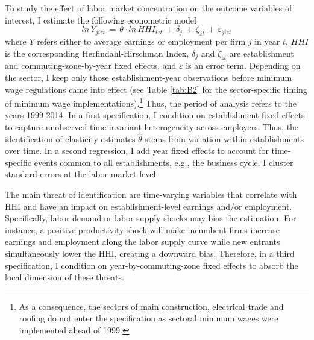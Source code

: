 \documentclass[11pt,oneside,reqno,xcolor=dvipsnames]{article} %
\begin{document}
To study the effect of labor market concentration on the outcome variables of interest, I estimate the following econometric model
\begin{equation}
\label{eq:2}
ln\,Y_{jizt} \,=\,  \theta \cdot ln\,H\!H\!I_{izt}  \,+\, \delta_{j}  \,+\, \zeta_{zt}  \,+\, \varepsilon_{jizt}
\end{equation}
where $Y$ refers either to average earnings or employment per firm $j$ in year $t$, $H\!H\!I$ is the corresponding Herfindahl-Hirschman Index, $\delta_{j}$ and $\zeta_{zt}$ are  establishment and commuting-zone-by-year fixed effects, and $\varepsilon$ is an error term. Depending on the sector, I keep only those establishment-year observations before minimum wage regulations came into effect (see Table \ref{tab:B2} for the sector-specific timing of minimum wage implementations).\footnote{As a consequence, the sectors of main construction, electrical trade and roofing do not enter the specification as sectoral minimum wages were implemented ahead of 1999.} Thus, the period of analysis refers to the years 1999-2014. In a first specification, I condition on establishment fixed effects to capture unobserved time-invariant heterogeneity across employers. Thus, the identification of elasticity estimates $\hat{\theta}$ stems from variation within establishments over time. In a second regression, I add year fixed effects to account for time-specific events common to all establishments, e.g., the business cycle. I cluster standard errors at the labor-market level.

The main threat of identification are time-varying variables that correlate with HHI and have an impact on establishment-level earnings and/or employment. Specifically, labor demand or labor supply shocks may bias the estimation. For instance, a positive productivity shock will make incumbent firms increase earnings and employment along the labor supply curve while new entrants simultaneously lower the HHI, creating a downward bias. Therefore, in a third specification, I condition on year-by-commuting-zone fixed effects to absorb the local dimension of these threats.
\end{document}
